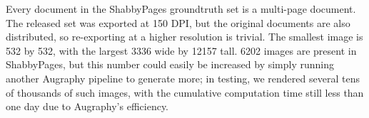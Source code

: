 \documentclass[runningheads]{llncs}
\begin{document}





Every document in the ShabbyPages groundtruth set is a multi-page document.
The released set was exported at 150 DPI, but the original documents are also distributed, so re-exporting at a higher resolution is trivial.
The smallest image is 532 by 532, with the largest 3336 wide by 12157 tall.
6202 images are present in ShabbyPages, but this number could easily be increased by simply running another Augraphy pipeline to generate more; in testing, we rendered several tens of thousands of such images, with the cumulative computation time still less than one day due to Augraphy's efficiency.
\end{document}
